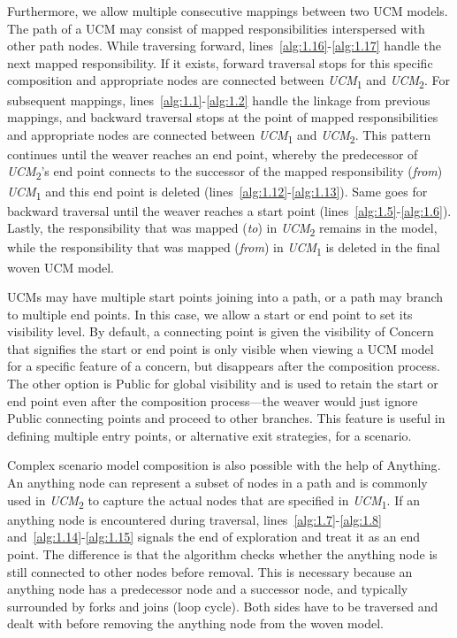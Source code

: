 Furthermore, we allow multiple consecutive mappings between two UCM models. The path of a UCM may consist of mapped responsibilities interspersed with other path nodes. While traversing forward, lines~\ref{alg:1.16}-\ref{alg:1.17} handle the next mapped responsibility. If it exists, forward traversal stops for this specific composition and appropriate nodes are connected between \emph{UCM}\textsubscript{1} and \emph{UCM}\textsubscript{2}. For subsequent mappings, lines~\ref{alg:1.1}-\ref{alg:1.2} handle the linkage from previous mappings, and backward traversal stops at the point of mapped responsibilities and appropriate nodes are connected between \emph{UCM}\textsubscript{1} and \emph{UCM}\textsubscript{2}. This pattern continues until the weaver reaches an end point, whereby the predecessor of \emph{UCM}\textsubscript{2}'s end point connects to the successor of the mapped responsibility (\emph{from}) \emph{UCM}\textsubscript{1} and this end point is deleted (lines~\ref{alg:1.12}-\ref{alg:1.13}). Same goes for backward traversal until the weaver reaches a start point (lines~\ref{alg:1.5}-\ref{alg:1.6}). Lastly, the responsibility that was mapped (\emph{to}) in \emph{UCM}\textsubscript{2} remains in the model, while the responsibility that was mapped (\emph{from}) in \emph{UCM}\textsubscript{1} is deleted in the final woven UCM model.

UCMs may have multiple start points joining into a path, or a path may branch to multiple end points. In this case, we allow a start or end point to set its visibility level. By default, a connecting point is given the visibility of {\cls Concern} that signifies the start or end point is only visible when viewing a UCM model for a specific feature of a concern, but disappears after the composition process. The other option is {\cls Public} for global visibility and is used to retain the start or end point even after the composition process---the weaver would just ignore {\cls Public} connecting points and proceed to other branches. This feature is useful in defining multiple entry points, or alternative exit strategies, for a scenario.

Complex scenario model composition is also possible with the help of {\cls Anything}. An anything node can represent a subset of nodes in a path and is commonly used in \emph{UCM}\textsubscript{2} to capture the actual nodes that are specified in \emph{UCM}\textsubscript{1}. If an anything node is encountered during traversal, lines~\ref{alg:1.7}-\ref{alg:1.8} and~\ref{alg:1.14}-\ref{alg:1.15} signals the end of exploration and treat it as an end point. The difference is that the algorithm checks whether the anything node is still connected to other nodes before removal. This is necessary because an anything node has a predecessor node and a successor node, and typically surrounded by forks and joins (loop cycle). Both sides have to be traversed and dealt with before removing the anything node from the woven model.


